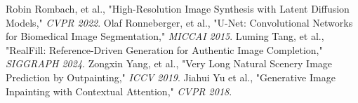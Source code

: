 \documentclass[sigconf]{acmart}
\begin{document}
\begin{thebibliography}{9}
     Robin Rombach, et al., "High-Resolution Image Synthesis with Latent Diffusion Models," \textit{CVPR 2022}.
     Olaf Ronneberger, et al., "U-Net: Convolutional Networks for Biomedical Image Segmentation," \textit{MICCAI 2015}.
     Luming Tang, et al., "RealFill: Reference-Driven Generation for Authentic Image Completion," \textit{SIGGRAPH 2024}.
     Zongxin Yang, et al., "Very Long Natural Scenery Image Prediction by Outpainting," \textit{ICCV 2019}.
     Jiahui Yu et al., "Generative Image Inpainting with Contextual Attention," \textit{CVPR 2018}.
\end{thebibliography}
\end{document}
